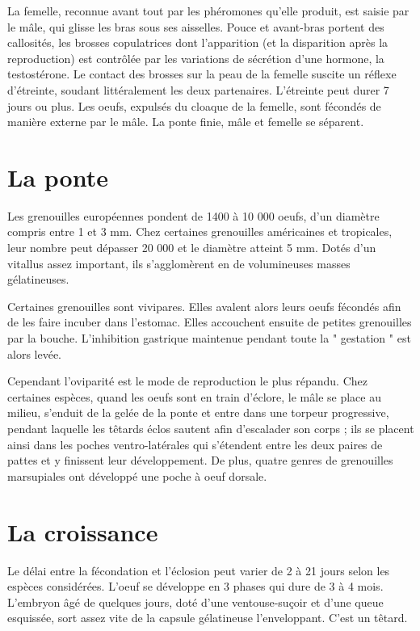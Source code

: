         La femelle, reconnue avant tout par les phéromones qu’elle produit, est saisie par le mâle, qui glisse les bras sous ses aisselles. Pouce et avant-bras portent des callosités, les brosses copulatrices dont l’apparition (et la disparition après la reproduction) est contrôlée par les variations de sécrétion d’une hormone, la testostérone. Le contact des brosses sur la peau de la femelle suscite un réflexe d’étreinte, soudant littéralement les deux partenaires. L’étreinte peut durer 7 jours ou plus. Les oeufs, expulsés du cloaque de la femelle, sont fécondés de manière externe par le mâle. La ponte finie, mâle et femelle se séparent.

 
\section{La ponte}

        Les grenouilles européennes pondent de 1400 à 10 000 oeufs, d’un diamètre compris entre 1 et 3 mm. Chez certaines grenouilles américaines et tropicales, leur nombre peut dépasser 20 000 et le diamètre atteint 5 mm. Dotés d’un vitallus assez important, ils s’agglomèrent en de volumineuses masses gélatineuses.

        Certaines grenouilles sont vivipares. Elles avalent alors leurs oeufs fécondés afin de les faire incuber dans l’estomac. Elles accouchent ensuite de petites grenouilles par la bouche. L’inhibition gastrique maintenue pendant toute la " gestation " est alors levée.

        Cependant l’oviparité est le mode de reproduction le plus répandu. Chez certaines espèces, quand les oeufs sont en train d’éclore, le mâle se place au milieu, s’enduit de la gelée de la ponte et entre dans une torpeur progressive, pendant laquelle les têtards éclos sautent afin d’escalader son corps ; ils se placent ainsi dans les poches ventro-latérales qui s’étendent entre les deux paires de pattes et y finissent leur développement. De plus, quatre genres de grenouilles marsupiales ont développé une poche à oeuf dorsale.

         

\section{La croissance}

        Le délai entre la fécondation et l’éclosion peut varier de 2 à 21 jours selon les espèces considérées. L’oeuf se développe en 3 phases qui dure de 3 à 4 mois. L’embryon âgé de quelques jours, doté d’une ventouse-suçoir et d’une queue esquissée, sort assez vite de la capsule gélatineuse l’enveloppant. C’est un têtard.

